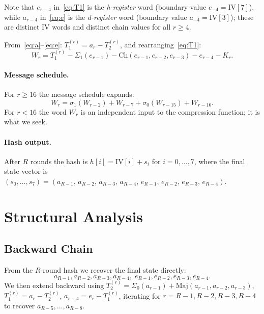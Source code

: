 \documentclass[11pt,a4paper]{article}
\newcommand{\Sig}[1]{\Sigma_{#1}}
\newcommand{\sig}[1]{\sigma_{#1}}
\newcommand{\Maj}{\mathrm{Maj}}
\newcommand{\Ch}{\mathrm{Ch}}
\begin{document}
Note that $e_{r-4}$ in~\eqref{eq:T1} is the \emph{h-register} word
(boundary value $e_{-4}=\mathrm{IV}[7]$), while $a_{r-4}$ in~\eqref{eq:e}
is the \emph{d-register} word (boundary value $a_{-4}=\mathrm{IV}[3]$);
these are distinct IV words and distinct chain values for all $r\ge 4$.

From~\eqref{eq:a}--\eqref{eq:e}: $T_1^{(r)} = a_r - T_2^{(r)}$,
and rearranging~\eqref{eq:T1}:
\begin{equation}
  W_r = T_1^{(r)} - \Sig{1}(e_{r-1}) - \Ch(e_{r-1},e_{r-2},e_{r-3})
        - e_{r-4} - K_r.
  \label{eq:W-round-inv}
\end{equation}

\paragraph{Message schedule.}
For $r \geq 16$ the message schedule expands:
\begin{equation}
  W_r = \sig{1}(W_{r-2}) + W_{r-7} + \sig{0}(W_{r-15}) + W_{r-16}.
  \label{eq:schedule}
\end{equation}
For $r < 16$ the word $W_r$ is an independent input to the compression
function; it is what we seek.

\paragraph{Hash output.}
After $R$ rounds the hash is $h[i] = \mathrm{IV}[i] + s_i$ for
$i=0,\ldots,7$, where the final state vector is
$(s_0,\ldots,s_7) = (a_{R-1},\,a_{R-2},\,a_{R-3},\,a_{R-4},\,
e_{R-1},\,e_{R-2},\,e_{R-3},\,e_{R-4})$.

\section{Structural Analysis}
\label{sec:structure}

\subsection{Backward Chain}

From the $R$-round hash we recover the final state directly:
\[
  a_{R-1}, a_{R-2}, a_{R-3}, a_{R-4},\;
  e_{R-1}, e_{R-2}, e_{R-3}, e_{R-4}.
\]
We then extend backward using
$T_2^{(r)} = \Sig{0}(a_{r-1}) + \Maj(a_{r-1},a_{r-2},a_{r-3})$,
$T_1^{(r)} = a_r - T_2^{(r)}$,
$a_{r-4} = e_r - T_1^{(r)}$,
iterating for $r = R-1, R-2, R-3, R-4$ to recover
$a_{R-5},\ldots,a_{R-8}$.
\end{document}
